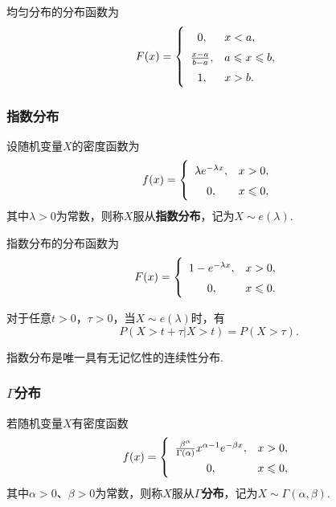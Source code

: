 \begin{theorem}
均匀分布的分布函数为\begin{equation}
F(x) = \left\{ \def\arraystretch{1.5}
\begin{array}{cl}
0, & x < a, \\
\frac{x-a}{b-a}, & a \leqslant x \leqslant b, \\
1, & x > b. \\
\end{array} \right.
\end{equation}
\end{theorem}

\subsubsection{指数分布}
\begin{definition}
设随机变量\(X\)的密度函数为\begin{equation}
f(x) = \left\{ \def\arraystretch{1.5}
\begin{array}{cl}
\lambda e^{-\lambda x}, & x > 0, \\
0, & x \leqslant 0, \\
\end{array} \right.
\end{equation}其中\(\lambda > 0\)为常数，则称\(X\)服从\textbf{指数分布}，记为\(X \sim e(\lambda)\).
\end{definition}

\begin{theorem}
指数分布的分布函数为\begin{equation}
F(x) = \left\{ \def\arraystretch{1.5}
\begin{array}{cl}
1 - e^{-\lambda x}, & x > 0, \\
0, & x \leqslant 0. \\
\end{array} \right.
\end{equation}
\end{theorem}

\begin{theorem}[指数分布的无记忆性]
对于任意\(t > 0\)，\(\tau > 0\)，当\(X \sim e(\lambda)\)时，有\[
P(X > t + \tau \vert X > t) = P(X > \tau).
\]

指数分布是唯一具有无记忆性的连续性分布.
\end{theorem}

\subsubsection{\texorpdfstring{\(\Gamma\)}{Γ}分布}
\begin{definition}
若随机变量\(X\)有密度函数\begin{equation}
f(x) = \left\{
\def\arraystretch{1.5}
\begin{array}{cl}
\frac{\beta^{\alpha}}{\Gamma(\alpha)} x^{\alpha-1} e^{-\beta x}, & x > 0, \\
0, & x \leqslant 0, \\
\end{array} \right.
\end{equation}其中\(\alpha > 0\)、\(\beta > 0\)为常数，则称\(X\)服从\textbf{\(\Gamma\)分布}，记为\(X \sim \Gamma(\alpha,\beta)\).
\end{definition}

